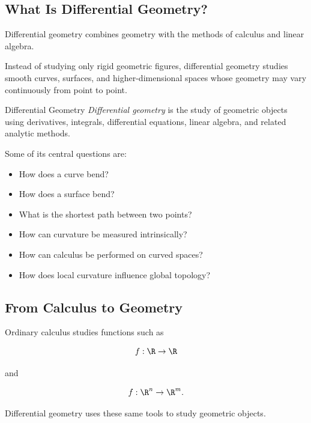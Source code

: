 \subsection{What Is Differential Geometry?}
\label{subsec:what-is-differential-geometry}

Differential geometry combines geometry with the methods of calculus and
linear algebra.

Instead of studying only rigid geometric figures, differential geometry
studies smooth curves, surfaces, and higher-dimensional spaces whose geometry
may vary continuously from point to point.

\begin{definitionbox}{Differential Geometry}
\emph{Differential geometry} is the study of geometric objects using
derivatives, integrals, differential equations, linear algebra, and related
analytic methods.
\end{definitionbox}

Some of its central questions are:

\begin{itemize}
    \item How does a curve bend?
    \item How does a surface bend?
    \item What is the shortest path between two points?
    \item How can curvature be measured intrinsically?
    \item How can calculus be performed on curved spaces?
    \item How does local curvature influence global topology?
\end{itemize}

\subsection{From Calculus to Geometry}
\label{subsec:calculus-to-geometry}

Ordinary calculus studies functions such as

\[
f:\R\to\R
\]

and

\[
f:\R^n\to\R^m.
\]

Differential geometry uses these same tools to study geometric objects.


